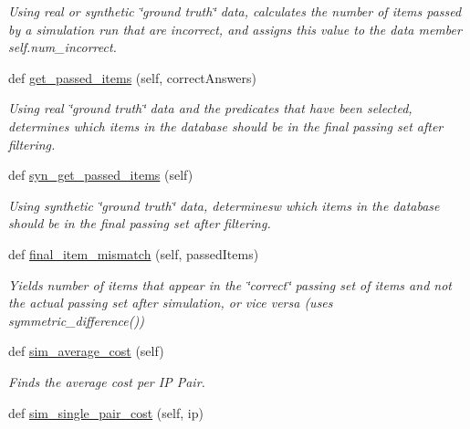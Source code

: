 \begin{DoxyCompactItemize}
\begin{DoxyCompactList}\small\item\em Using real or synthetic \char`\"{}ground truth\char`\"{} data, calculates the number of items passed by a simulation run that are incorrect, and assigns this value to the data member self.\+num\+\_\+incorrect. \end{DoxyCompactList}\item 
def \hyperlink{classdynamicfilterapp_1_1test__simulations_1_1_simulation_test_a7c7a6eb7abd732121d6b150823fbd1d2}{get\+\_\+passed\+\_\+items} (self, correct\+Answers)
\begin{DoxyCompactList}\small\item\em Using real \char`\"{}ground truth\char`\"{} data and the predicates that have been selected, determines which items in the database should be in the final passing set after filtering. \end{DoxyCompactList}\item 
def \hyperlink{classdynamicfilterapp_1_1test__simulations_1_1_simulation_test_a33fcff5dca045189c9ed364d42956b29}{syn\+\_\+get\+\_\+passed\+\_\+items} (self)
\begin{DoxyCompactList}\small\item\em Using synthetic \char`\"{}ground truth\char`\"{} data, determinesw which items in the database should be in the final passing set after filtering. \end{DoxyCompactList}\item 
def \hyperlink{classdynamicfilterapp_1_1test__simulations_1_1_simulation_test_ae535f7d0761a00bc82b9fdcd19556403}{final\+\_\+item\+\_\+mismatch} (self, passed\+Items)
\begin{DoxyCompactList}\small\item\em Yields number of items that appear in the \char`\"{}correct\char`\"{} passing set of items and not the actual passing set after simulation, or vice versa (uses symmetric\+\_\+difference()) \end{DoxyCompactList}\item 
def \hyperlink{classdynamicfilterapp_1_1test__simulations_1_1_simulation_test_ae3108f4ec1a39e163c4fc07f11b63c15}{sim\+\_\+average\+\_\+cost} (self)
\begin{DoxyCompactList}\small\item\em Finds the average cost per IP Pair. \end{DoxyCompactList}\item 
def \hyperlink{classdynamicfilterapp_1_1test__simulations_1_1_simulation_test_abf3ff009ae041f4856e34b301c551224}{sim\+\_\+single\+\_\+pair\+\_\+cost} (self, ip)

\end{DoxyCompactItemize}
